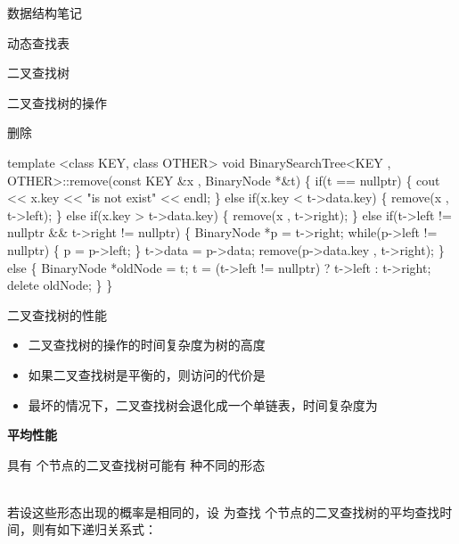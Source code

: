 \documentclass[
  ignorenonframetext,
]{beamer}
\newenvironment{Shaded}{}{}
\newcommand{\NormalTok}[1]{#1}
\providecommand{\tightlist}{%
  \setlength{\itemsep}{0pt}\setlength{\parskip}{0pt}}
\begin{document}
\begin{frame}[fragile]{数据结构笔记}
\begin{block}{动态查找表}
\begin{block}{二叉查找树}
\begin{block}{二叉查找树的操作}
\begin{block}{删除}
\begin{Shaded}
\begin{Highlighting}[]
\NormalTok{template \textless{}class KEY, class OTHER\textgreater{}}
\NormalTok{void BinarySearchTree\textless{}KEY , OTHER\textgreater{}::remove(const KEY \&x , BinaryNode *\&t)}
\NormalTok{\{}
\NormalTok{  if(t == nullptr)}
\NormalTok{  \{}
\NormalTok{    cout \textless{}\textless{} x.key \textless{}\textless{} "is not exist" \textless{}\textless{} endl;}
\NormalTok{  \}}
\NormalTok{  else if(x.key \textless{} t{-}\textgreater{}data.key)}
\NormalTok{  \{}
\NormalTok{    remove(x , t{-}\textgreater{}left);}
\NormalTok{  \}}
\NormalTok{  else if(x.key \textgreater{} t{-}\textgreater{}data.key)}
\NormalTok{  \{}
\NormalTok{    remove(x , t{-}\textgreater{}right);}
\NormalTok{  \}}
\NormalTok{  else if(t{-}\textgreater{}left != nullptr \&\& t{-}\textgreater{}right != nullptr)}
\NormalTok{  \{}
\NormalTok{    BinaryNode *p = t{-}\textgreater{}right;}
\NormalTok{    while(p{-}\textgreater{}left != nullptr)}
\NormalTok{    \{}
\NormalTok{      p = p{-}\textgreater{}left;}
\NormalTok{    \}}
\NormalTok{    t{-}\textgreater{}data = p{-}\textgreater{}data;}
\NormalTok{    remove(p{-}\textgreater{}data.key , t{-}\textgreater{}right);}
\NormalTok{  \}}
\NormalTok{  else}
\NormalTok{  \{}
\NormalTok{    BinaryNode *oldNode = t;}
\NormalTok{    t = (t{-}\textgreater{}left != nullptr) ? t{-}\textgreater{}left : t{-}\textgreater{}right;}
\NormalTok{    delete oldNode;}
\NormalTok{  \}}
\NormalTok{\}}
\end{Highlighting}
\end{Shaded}
\end{block}
\end{block}

\begin{block}{二叉查找树的性能}
\protect{}\label{ux4e8cux53c9ux67e5ux627eux6811ux7684ux6027ux80fd}
\begin{itemize}
\tightlist
\item
  二叉查找树的操作的时间复杂度为树的高度
\item
  如果二叉查找树是平衡的，则访问的代价是 {}
\item
  最坏的情况下，二叉查找树会退化成一个单链表，时间复杂度为 {}
\end{itemize}

\textbf{平均性能}

具有 {} 个节点的二叉查找树可能有 {} 种不同的形态\\
{}\strut \\
若设这些形态出现的概率是相同的，设 {} 为查找 {}
个节点的二叉查找树的平均查找时间，则有如下递归关系式：
\end{block}
\end{block}


\end{block}
\end{frame}
\end{document}
